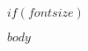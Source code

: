 $if(fontsize)$\documentclass[$fontsize$]{article}$else$\documentclass[11pt]{article}$endif$
\begin{document}
$body$
\end{document}
